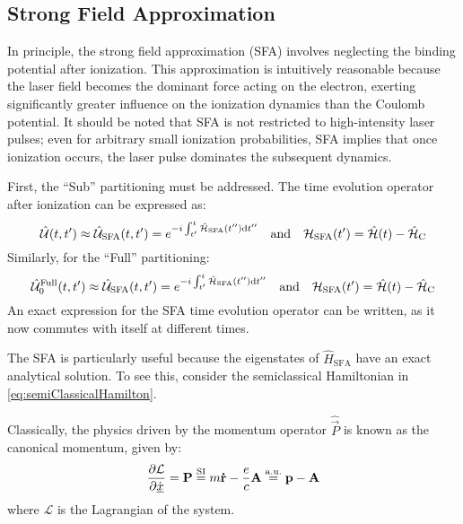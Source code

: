 \subsection{Strong Field Approximation}
In principle, the strong field approximation (SFA) involves neglecting the binding potential after ionization.
This approximation is intuitively reasonable because the laser field becomes the dominant force acting on the electron, exerting significantly greater influence on the ionization dynamics than the Coulomb potential.
It should be noted that SFA is not restricted to high-intensity laser pulses; even for arbitrary small ionization probabilities, SFA implies that once ionization occurs, the laser pulse dominates the subsequent dynamics.

First, the ``Sub'' partitioning must be addressed.
The time evolution operator after ionization can be expressed as:
\begin{equation*}
    \hat{\mathcal{U}}(t,t') \approx \hat{\mathcal{U}}_{\mathrm{SFA}}(t,t')=e^{-i \int_{t'}^{t} \hat{\mathcal{H}}_{\mathrm{SFA}}(t'') \mathrm{d} t''} \quad \text{and} \quad \mathcal{H}_{\mathrm{SFA}}(t') = \hat{\mathcal{H}}(t) - \hat{\mathcal{H}}_{\mathrm{C}}      \label{eq:sfa_formula}
\end{equation*}
Similarly, for the ``Full'' partitioning:
\begin{equation*}
    \hat{\mathcal{U}}^{\mathrm{Full}}_0(t,t') \approx \hat{\mathcal{U}}_{\mathrm{SFA}}(t,t')=e^{-i \int_{t'}^{t} \hat{\mathcal{H}}_{\mathrm{SFA}}(t'') \mathrm{d} t''} \quad \text{and} \quad \mathcal{H}_{\mathrm{SFA}}(t') = \hat{\mathcal{H}}(t) - \hat{\mathcal{H}}_{\mathrm{C}}      \label{eq:sfa_formula}
\end{equation*}
An exact expression for the SFA time evolution operator can be written, as it now commutes with itself at different times.

The SFA is particularly useful because the eigenstates of $\hat{H}_{\mathrm{SFA}}$ have an exact analytical solution.
To see this, consider the semiclassical Hamiltonian in \eqref{eq:semiClassicalHamilton}.

Classically, the physics driven by the momentum operator $\hat{\vec{P}}$ is known as the canonical momentum, given by:
\begin{equation}
    \frac{\partial \mathcal{L}}{\partial \dot{\underline{x}}} = \mathbf{P} \stackrel{\mathrm{SI}}{=} m\mathbf{\dot{r}} - \frac{e}{c}\mathbf{A} \stackrel{\mathrm{a.u.}}{=} \mathbf{p} - \mathbf{A}    \label{eq:canonicalMomentum}
\end{equation}
where $\mathcal{L}$ is the Lagrangian of the system.

